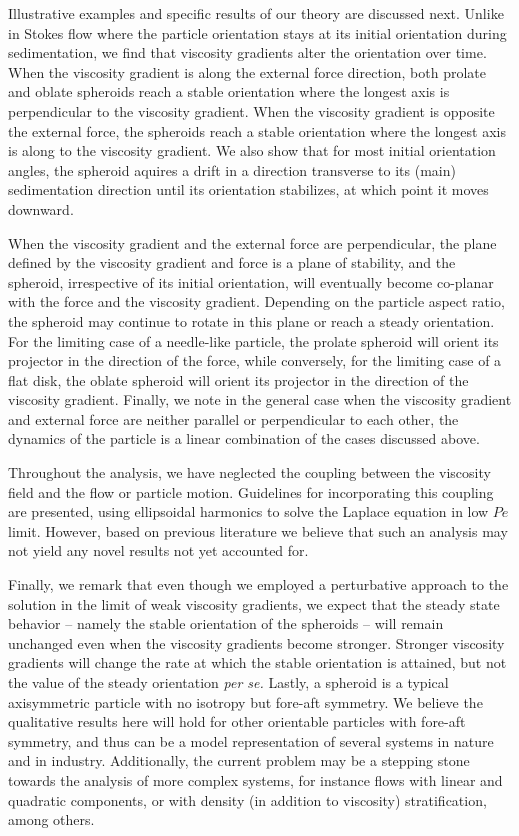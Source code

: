 \documentclass{jfm}
\begin{document}
Illustrative examples and specific results of our theory are discussed next. Unlike in Stokes flow where the particle orientation stays at its initial orientation during sedimentation, we find that viscosity gradients alter the orientation over time. When the viscosity gradient is along the external force direction, both prolate and oblate spheroids reach a stable orientation where the longest axis is perpendicular to the viscosity gradient. When the viscosity gradient is opposite the external force, the spheroids reach a stable orientation where the longest axis is along to the viscosity gradient.  We also show that for most initial orientation angles, the spheroid aquires a drift in a direction transverse to its (main) sedimentation direction until its orientation stabilizes, at which point it moves downward. 

When the viscosity gradient and the external force are perpendicular, the plane defined by the viscosity gradient and force is a plane of stability, and the spheroid, irrespective of its initial orientation, will eventually become co-planar with the force and the viscosity gradient.  Depending on the particle aspect ratio, the spheroid may continue to rotate in this plane or reach a steady orientation. For the limiting case of a needle-like particle, the prolate spheroid will orient its projector in the direction of the force, while conversely, for the limiting case of a flat disk, the oblate spheroid will orient its projector in the direction of the viscosity gradient.  Finally, we note in the general case when the viscosity gradient and external force are neither parallel or perpendicular to each other, the dynamics of the particle is a linear combination of the cases discussed above.

Throughout the analysis, we have neglected the coupling between the viscosity field and the flow or particle motion. Guidelines for incorporating this coupling are presented, using ellipsoidal harmonics to solve the Laplace equation in low $Pe$ limit.  However, based on previous literature \citep{Vaseem_Elfring_Viscosity} we believe that such an analysis may not yield any novel results not yet accounted for.

Finally, we remark that even though we employed a perturbative approach to the solution in the limit of weak viscosity gradients, we expect that the steady state behavior -- namely the stable orientation of the spheroids -- will remain unchanged even when the viscosity gradients become stronger. Stronger viscosity gradients will change the rate at which the stable orientation is attained, but not the value of the steady orientation \textit{per se.}  Lastly, a spheroid is a typical axisymmetric particle with no isotropy but fore-aft symmetry. We believe the qualitative results here will hold for other orientable particles with fore-aft symmetry, and thus can be a model representation of several systems in nature and in industry. Additionally, the current problem may be a stepping stone towards the analysis of more complex systems, for instance flows with linear and quadratic components, or with density (in addition to viscosity) stratification, among others.
\end{document}
